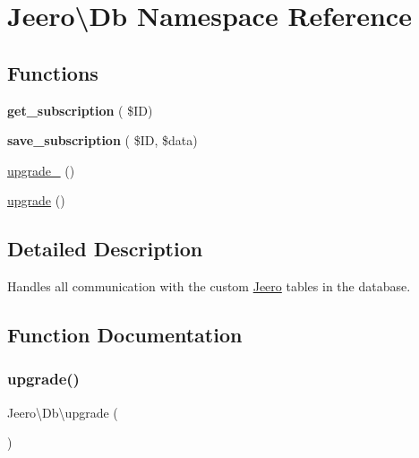 \hypertarget{namespaceJeero_1_1Db}{}\section{Jeero\textbackslash{}Db Namespace Reference}
\label{namespaceJeero_1_1Db}
\subsection*{Functions}
\begin{DoxyCompactItemize}
\item 
\mbox{\label{namespaceJeero_1_1Db_a561030bb75e2ac27c9203ac49ed9e267}} 
{\bfseries get\+\_\+subscription} ( \$ID)
\item 
\mbox{\label{namespaceJeero_1_1Db_a489bf14547c01ad7a7a4d6980653d19f}} 
{\bfseries save\+\_\+subscription} ( \$ID, \$data)
\item 
\hyperlink{namespaceJeero_1_1Db_aeeae82925ec06323d8a39bad5f79113e}{upgrade\+\_} ()
\item 
\hyperlink{namespaceJeero_1_1Db_aa6128a08cd67244aa44fd408b532cd06}{upgrade} ()
\end{DoxyCompactItemize}


\subsection{Detailed Description}
Handles all communication with the custom \hyperlink{namespaceJeero}{Jeero} tables in the database. 

\subsection{Function Documentation}
\mbox{\label{namespaceJeero_1_1Db_aa6128a08cd67244aa44fd408b532cd06}} 
\subsubsection{\texorpdfstring{upgrade()}{upgrade()}}
{\footnotesize\ttfamily Jeero\textbackslash{}\+Db\textbackslash{}upgrade (\begin{DoxyParamCaption}{ }\end{DoxyParamCaption})}

